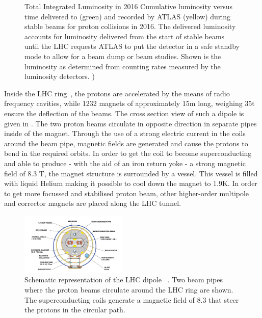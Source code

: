 \begin{figure}[ht]
\begin{minipage}[b]{0.4\textwidth}
	\caption{Total Integrated Luminosity in 2016 
		Cumulative luminosity versus time delivered to (green) and recorded by ATLAS (yellow) during stable beams for proton collisions  in 2016. The delivered luminosity accounts for luminosity delivered from the start of stable beams until the LHC requests ATLAS to put the detector in a safe standby mode to allow for a beam dump or beam studies. Shown is the luminosity as determined from counting rates measured by the luminosity detectors. )}
	\end{minipage}
	\label{fig:IntLumi}
\end{figure}

 
Inside the LHC ring~\cite{Bruning:782076}, the protons are accelerated by the means of radio frequency cavities, while 1232  magnets of approximately 15\si{ \m} long, weighing 35\si{ \tonne} ensure the deflection of the beams. The cross section view of such a dipole is given in . The two proton beams circulate in opposite direction in separate pipes inside of the magnet. Through the use of a strong electric current in the coils around the beam pipe, magnetic fields are generated and cause the protons to bend in the required orbits. In order to get the coil to become superconducting and able to produce - with the aid of an iron return yoke - a strong magnetic field of 8.3 \si{ \tesla}, the magnet structure is surrounded by a vessel. This vessel is filled with liquid Helium making it possible to cool down the magnet to 1.9\si{ \kelvin}. In order to get more focussed and stabilised proton beam, other higher-order multipole and corrector magnets are placed along the LHC tunnel.

 \begin{figure}[ht]
	\centering
	\includegraphics[width=0.45\textwidth]{2_ExperimentalSetup/Figures/lhc-pho-1998-341}
	\caption{Schematic representation of the LHC dipole~\cite{Jean-Luc:841539} . Two beam pipes where the proton beams circulate around the LHC ring are shown. The superconducting coils generate a magnetic field of 8.3 \tesla that steer the protons in the circular path. }
	\label{fig:dipole}
\end{figure}




